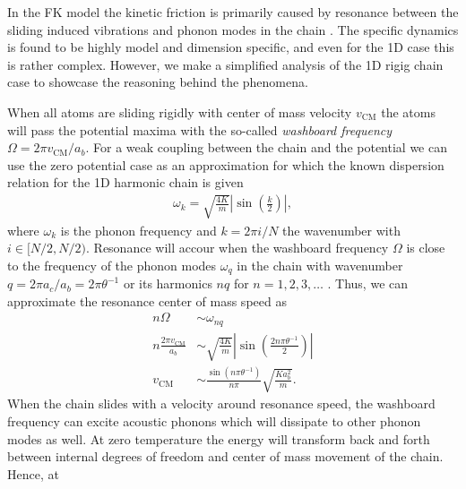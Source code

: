 

In the \acrshort{FK} model the kinetic friction is primarily caused by resonance between
the sliding induced vibrations and phonon modes in the chain \cite{FK2D}. The specific dynamics is found to be highly model and dimension specific, and even for the 1D case this is rather complex. However, we make a simplified analysis of the 1D rigig chain case to showcase the reasoning behind the phenomena.

When all atoms are sliding rigidly with center of mass velocity $v_{{\text{CM}}}$ the atoms will pass the potential maxima with the so-called \textit{washboard frequency} $\Omega = 2\pi v_{{\text{CM}}} / a_b$. For a weak coupling between the chain and the potential we can use the zero potential case as an approximation for which the known dispersion relation for the 1D harmonic chain is given \cite[p. 92]{Kittel2004}
\begin{align*}
  \omega_k = \sqrt{\frac{4 K}{m}} \left|\sin{\left(\frac{k}{2}\right)}\right|,
\end{align*}
where $\omega_k$ is the phonon frequency and $k = 2\pi i / N$ the wavenumber with $i\in [N/2, N/2)$. Resonance will accour when the washboard frequency $\Omega$ is close to the frequency of the phonon modes $\omega_q$ in the chain with wavenumber $q = 2\pi a_c / a_b = 2\pi \theta^{-1}$ or its harmonics $nq$ for $n = 1, 2, 3, \hdots$ \cite{van_den_Ende_2012}. Thus, we can approximate the resonance center of mass speed as
\begin{align*}
    n \Omega &\sim \omega_{nq} \\
    n \frac{2\pi v_{\text{CM}}}{a_b} &\sim \sqrt{\frac{4K}{m}} \left| \sin{\left(\frac{2n \pi \theta^{-1}}{2}\right)}\right| \\
    v_{\text{CM}} &\sim \frac{\sin{(n\pi \theta^{-1})}}{n \pi} \sqrt{\frac{Ka_b^2}{m}}.
\end{align*}
When the chain slides with a velocity around resonance speed, the washboard
frequency can excite acoustic phonons which will dissipate to other phonon modes
as well. At zero temperature the energy will transform back and forth between
internal degrees of freedom and center of mass movement of the chain. Hence, at

